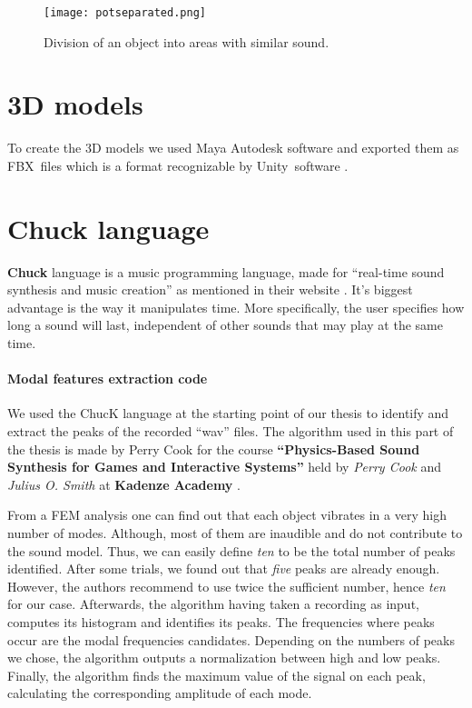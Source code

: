\begin{figure}[H]
  \centering
    \texttt{[image: potseparated.png]}
      \caption{Division of an object into areas with similar sound.}
      \label{fig:pot_sep}
\end{figure} 

\section{3D models}
To create the 3D models we used Maya Autodesk software \cite{bib:maya} and exported them as FBX\textregistered\ files \cite{bib:fbx} which is a format recognizable by Unity\textregistered\ software \cite{bib:unity}.

\section{Chuck language}
\textbf{Chuck} language is a music programming language, made for ``real-time sound synthesis and music creation'' as mentioned in their website \cite{bib:chuck}. It's biggest advantage is the way it manipulates time. More specifically, the user specifies how long a sound will last, independent of other sounds that may play at the same time.

\paragraph{Modal features extraction code\\}
We used the ChucK language at the starting point of our thesis to identify and extract the peaks of the recorded ``wav'' files. The algorithm used in this part of the thesis is made by Perry Cook for the course \textbf{``Physics-Based Sound Synthesis for Games and Interactive Systems''} held by \textit{Perry Cook} and \textit{Julius O. Smith} at \textbf{Kadenze Academy} \cite{bib:physicsbasedcourse}.

From a FEM analysis one can find out that each object vibrates in a very high number of modes. Although, most of them are inaudible and do not contribute to the sound model. Thus, we can easily define \textit{ten} to be the total number of peaks identified. After some trials, we found out that \textit{five} peaks are already enough. However, the authors recommend to use twice the sufficient number, hence \textit{ten} for our case. Afterwards, the algorithm having taken a recording as input, computes its histogram and identifies its peaks. The frequencies where peaks occur are the modal frequencies candidates. Depending on the numbers of peaks we chose, the algorithm outputs a normalization between high and low peaks. Finally, the algorithm finds the maximum value of the signal on each peak, calculating the corresponding amplitude of each mode.

